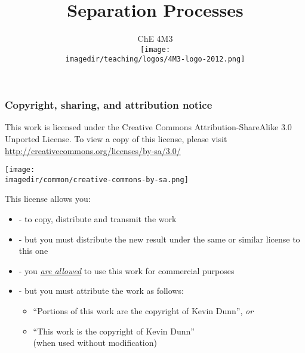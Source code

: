 \documentclass[11pt]{beamer}
\title[]{\LARGE Separation Processes}
\subtitle[]{\Large ChE 4M3 \\ \vspace{0.5cm} \texttt{[image: \\imagedir/teaching/logos/4M3-logo-2012.png]} \vspace{-1.5cm} }\author[]{}
\institute[]{}
\date[]{\copyright~ Kevin Dunn, \today \\ \vspace{1cm}{\footnotesize {\tt kevin.dunn@mcmaster.ca}\\ \href{http://learnche.mcmaster.ca/4M3}{http://learnche.mcmaster.ca/4M3}\\ \vspace{1cm}}

{\footnotesize Overall revision number: \hgversion (\monthname~\THEYEAR)} %
}
\begin{document}
	
\begin{frame} \titlepage \end{frame}

	\begin{frame}\frametitle{Copyright, sharing, and attribution notice}

		{\footnotesize This work is licensed under the Creative Commons Attribution-ShareAlike 3.0 Unported License. To view a copy of this license, 
		please visit \href{http://creativecommons.org/licenses/by-sa/3.0/}{http://creativecommons.org/licenses/by-sa/3.0/}}
		\vspace{-1.0cm}
		\begin{flushright}
			\texttt{[image: \\imagedir/common/creative-commons-by-sa.png]}
		\end{flushright}	
		\vspace{-0.2cm}
		\begin{exampleblock}{}
			{\small This license allows you: }
			\begin{itemize}
				\item	{} - to copy, distribute and transmit the work
				\item	{} - but you must distribute the new result under the same or similar license to this one
				\item	{} - you \underline{\emph{are allowed}} to use this work for commercial purposes 
				\item	{} - but you must attribute the work as follows:
				\begin{itemize}
					\item	``Portions of this work are the copyright of Kevin Dunn'', \emph{or}
					\item	``This work is the copyright of Kevin Dunn'' \\{\tiny (when used without modification)}
				\end{itemize} 
			\end{itemize}
		\end{exampleblock}
	\end{frame}
\end{document}
